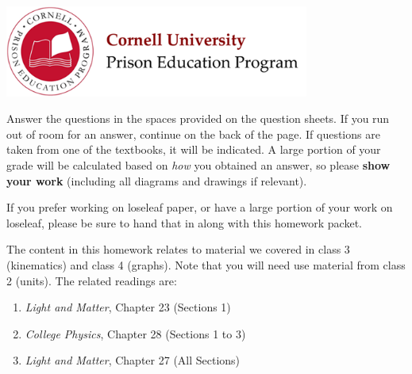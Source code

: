 \documentclass[addpoints,12pt]{exam}
\begin{document}

\begin{flushright}
\vspace{0.2in}

\end{flushright}

\begin{center}
\includegraphics[width=10cm]{../images/logo.png}
\end{center}

\begin{center}
\end{center}

Answer the questions in the spaces provided on the question sheets. If you run out of room for an answer, continue on the back of the page. If questions are taken from one of the textbooks, it will be indicated. A large portion of your grade will be calculated based on \textit{how} you obtained an answer, so please \textbf{show your work} (including all diagrams and drawings if relevant).

If you prefer working on loseleaf paper, or have a large portion of your work on loseleaf, please be sure to hand that in along with this homework packet.

The content in this homework relates to material we covered in class 3 (kinematics) and class 4 (graphs). Note that you will need use material from class 2 (units). The related readings are:
\begin{enumerate}
	\item \textit{Light and Matter}, Chapter 23 (Sections 1)
	\item \textit{College Physics}, Chapter 28 (Sections 1 to 3)
	\item \textit{Light and Matter}, Chapter 27 (All Sections)
\end{enumerate}
 
\end{document}
